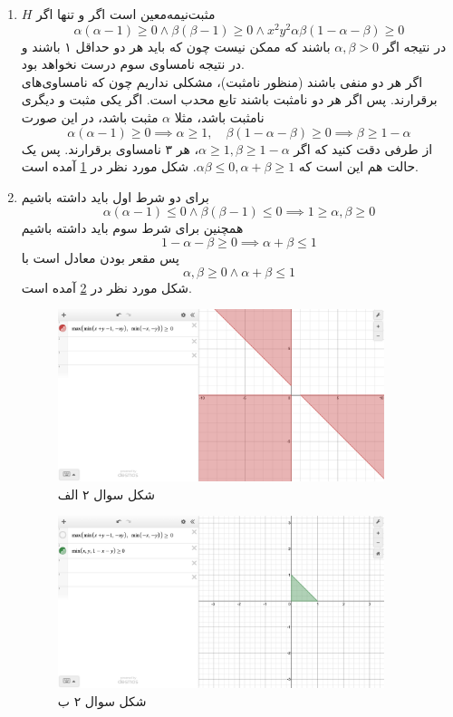 \begin{enumerate}
	\item 
	$H$ مثبت‌نیمه‌معین است اگر و تنها اگر
	\[
	\alpha (\alpha - 1) \ge 0 \land \beta (\beta - 1) \ge 0 \land x^2y^2\alpha \beta (1 - \alpha - \beta) \ge 0
	\]
	در نتیجه اگر 
	$\alpha, \beta > 0$
	باشند که ممکن نیست چون که 
	باید هر دو حداقل ۱ باشند و در نتیجه نامساوی سوم درست نخواهد بود.\\
	اگر هر دو منفی باشند (منظور نامثبت)، مشکلی نداریم چون که نامساوی‌های برقرارند. پس اگر هر دو نامثبت باشند تابع محدب است.
	اگر یکی مثبت و دیگری نامثبت باشد، مثلا $\alpha$ مثبت باشد، در این صورت
	\[
	\alpha (\alpha - 1) \ge 0 \implies \alpha \ge 1, \quad \beta(1 - \alpha - \beta) \ge 0 \implies
	\beta \ge 1 - \alpha 
	\]
	از طرفی دقت کنید که اگر 
	$\alpha \ge 1, \beta \ge 1- \alpha$،
	هر ۳ نامساوی برقرارند. پس یک حالت هم این است که 
	$\alpha\beta \le 0, \alpha + \beta \ge 1$.
	شکل مورد نظر در 
	\ref{fig2:convex}
	آمده است.
	\item 
برای دو شرط اول باید داشته باشیم
\[
\alpha(\alpha - 1) \le 0\land  \beta(\beta - 1) \le 0  \implies1 \ge  \alpha, \beta \ge 0
\]
همچنین  برای شرط سوم باید داشته باشیم
\[
1 - \alpha - \beta \ge 0 \implies \alpha + \beta \le 1
\]
پس مقعر بودن معادل است با
\[
\alpha, \beta \ge 0 \land \alpha + \beta \le 1
\]
شکل مورد نظر در 
\ref{fig2:concave}
آمده است.
\begin{figure}[H]
	\centering
	\includegraphics[width=0.9\textwidth]{convex}
	\caption{شکل سوال ۲ الف}
	\label{fig2:convex}
\end{figure}
\begin{figure}[H]
	\centering
	\includegraphics[width=0.9\textwidth]{concave}
	\caption{شکل سوال ۲ ب}
	\label{fig2:concave}
\end{figure}
\end{enumerate}
